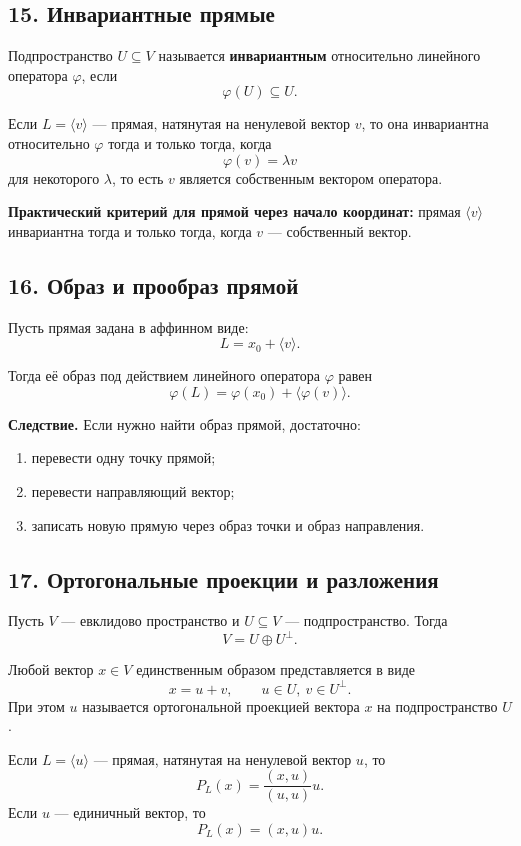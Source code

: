 \subsection*{15. Инвариантные прямые}

Подпространство $U\subseteq V$ называется \textbf{инвариантным} относительно линейного оператора $\varphi$, если
\[
\varphi(U)\subseteq U.
\]

Если $L=\langle v\rangle$ --- прямая, натянутая на ненулевой вектор $v$, то она инвариантна относительно $\varphi$ тогда и только тогда, когда
\[
\varphi(v)=\lambda v
\]
для некоторого $\lambda$, то есть $v$ является собственным вектором оператора.

\noindent
\textbf{Практический критерий для прямой через начало координат:}
прямая $\langle v\rangle$ инвариантна тогда и только тогда, когда $v$ --- собственный вектор.

\subsection*{16. Образ и прообраз прямой}

Пусть прямая задана в аффинном виде:
\[
L=x_0+\langle v\rangle.
\]

Тогда её образ под действием линейного оператора $\varphi$ равен
\[
\varphi(L)=\varphi(x_0)+\langle \varphi(v)\rangle.
\]

\noindent
\textbf{Следствие.}
Если нужно найти образ прямой, достаточно:
\begin{enumerate}
    \item перевести одну точку прямой;
    \item перевести направляющий вектор;
    \item записать новую прямую через образ точки и образ направления.
\end{enumerate}

\subsection*{17. Ортогональные проекции и разложения}

Пусть $V$ --- евклидово пространство и $U\subseteq V$ --- подпространство. Тогда
\[
V=U\oplus U^\perp.
\]

Любой вектор $x\in V$ единственным образом представляется в виде
\[
x=u+v,\qquad u\in U,\ v\in U^\perp.
\]
При этом $u$ называется ортогональной проекцией вектора $x$ на подпространство $U$.

Если $L=\langle u\rangle$ --- прямая, натянутая на ненулевой вектор $u$, то
\[
P_L(x)=\frac{(x,u)}{(u,u)}u.
\]
Если $u$ --- единичный вектор, то
\[
P_L(x)=(x,u)u.
\]


